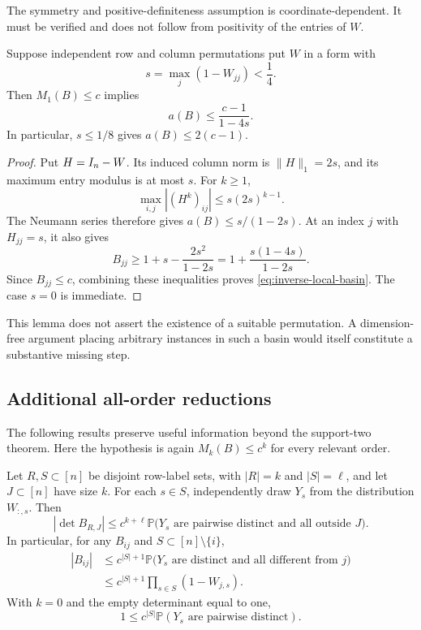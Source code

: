The symmetry and positive-definiteness assumption is
coordinate-dependent.  It must be verified and does not follow
from positivity of the entries of $W$.

\begin{lemma}
\label{lem:inverse-local-basin}
Suppose independent row and column permutations put $W$ in a form
with
\[
 s=\max_j(1-W_{jj})<\frac14.
\]
Then $M_1(B)\leq c$ implies
\begin{equation}
 a(B)\leq\frac{c-1}{1-4s}.
 \label{eq:inverse-local-basin}
\end{equation}
In particular, $s\leq1/8$ gives $a(B)\leq2(c-1)$.
\end{lemma}

\begin{proof}
Put $H=I_n-W$.  Its induced column norm is
$\|H\|_1=2s$, and its maximum entry modulus is at most $s$.
For $k\geq1$,
\[
 \max_{i,j}|(H^k)_{ij}|\leq s(2s)^{k-1}.
\]
The Neumann series therefore gives $a(B)\leq s/(1-2s)$.
At an index $j$ with $H_{jj}=s$, it also gives
\[
 B_{jj}\geq1+s-\frac{2s^2}{1-2s}
 =1+\frac{s(1-4s)}{1-2s}.
\]
Since $B_{jj}\leq c$, combining these inequalities proves
\eqref{eq:inverse-local-basin}.  The case $s=0$ is immediate.
\end{proof}

This lemma does not assert the existence of a suitable permutation.
A dimension-free argument placing arbitrary instances in such a
basin would itself constitute a substantive missing step.

\subsection{Additional all-order reductions}

The following results preserve useful information beyond the
support-two theorem.  Here the hypothesis is again
$M_k(B)\leq c^k$ for every relevant order.

\begin{proposition}
\label{prop:inverse-occupancy}
Let $R,S\subset[n]$ be disjoint row-label sets, with
$|R|=k$ and $|S|=\ell$, and let $J\subset[n]$ have size $k$.
For each $s\in S$, independently draw $Y_s$ from the distribution
$W_{:,s}$.  Then
\begin{equation}
 |\det B_{R,J}|
 \leq c^{k+\ell}\mathbb P\bigl(
     Y_s\text{ are pairwise distinct and all outside }J\bigr).
 \label{eq:inverse-occupancy}
\end{equation}
In particular, for any $B_{ij}$ and $S\subset[n]\setminus\{i\}$,
\begin{align}
 |B_{ij}|&\leq c^{|S|+1}
  \mathbb P\bigl(Y_s\text{ are distinct and all different from }j\bigr)
  \nonumber\\
 &\leq c^{|S|+1}\prod_{s\in S}(1-W_{j,s}).
 \label{eq:inverse-occupancy-entry}
\end{align}
With $k=0$ and the empty determinant equal to one,
\begin{equation}
 1\leq c^{|S|}\mathbb P(Y_s\text{ are pairwise distinct}).
 \label{eq:inverse-injection}
\end{equation}
\end{proposition}

